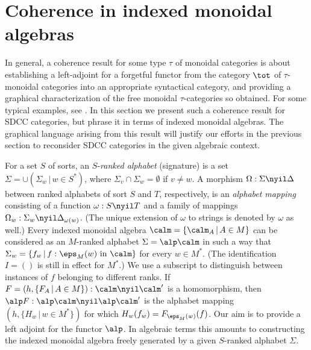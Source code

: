 \documentclass{eptcs}
\begin{document}
\section{Coherence in indexed monoidal algebras}
In general, a coherence result for some type $\tau $ of monoidal categories is about
establishing a left-adjoint for a forgetful functor from the category $\tot $ of
$\tau $-monoidal categories into an appropriate syntactical category, and providing a graphical
characterization of the free monoidal $\tau $-categories so obtained. For some typical
examples, see \cite{mcl,cc,acta,tcs}. In this section we present such a 
coherence result for SDCC categories, but phrase it in terms of indexed monoidal algebras.
The graphical language arising from this result will justify our efforts in the previous
section to reconsider SDCC categories in the given algebraic context.

For a set $S$ of sorts, an $S$-{\em ranked alphabet} (signature) is a set 
$\Sigma =\cup (\Sigma _w\,|\,w\in S^*)$, where $\Sigma _v\cap \Sigma _w=\emptyset $
if $v\neq w$. A morphism $\Omega :\Sigma \nyil \Delta $ between ranked alphabets of sort
$S$ and $T$, respectively, is an {\em alphabet mapping\/} consisting of a function
$\omega :S\nyil T$ and a family of mappings $\Omega _w:\Sigma _w\nyil \Delta _{\omega (w)}$.
(The unique extension of $\omega $ to strings is denoted by $\omega $ as well.)
Every indexed monoidal algebra $\calm =\{\calm _A\,|\,A\in M\}$ can be considered
as an $M$-ranked alphabet $\Sigma =\alp \calm $ in such a way that $\Sigma _w=
\{ f_w\,|\,f:\eps _M(w) \mbox{\ in\ } \calm \}$ for every $w\in M^*$. (The identification
$I=()$ is still in effect for $M^*$.) We use a subscript to distinguish
between instances of $f$ belonging to different ranks. If $F=(h, \{ F_A\,|\,A\in M\}):
\calm \nyil \calm '$ is a homomorphism, then $\alp F:\alp \calm \nyil \alp \calm '$ is 
the alphabet mapping $(h, \{ H_w\,|\,w\in M^*\})$ for which $H_w(f_w)=F_{\eps _M(w)}(f)$.
Our aim is to provide a left adjoint for the functor $\alp $. In algebraic terms this 
amounts to constructing the indexed monoidal algebra freely generated by a given 
$S$-ranked alphabet $\Sigma $.
\end{document}
